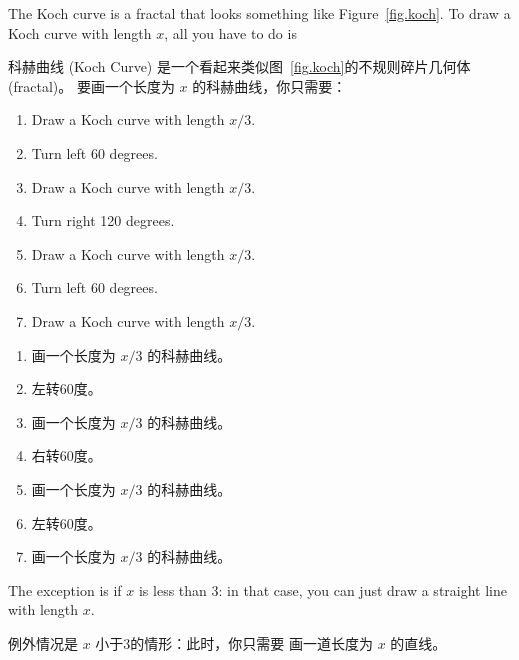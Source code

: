 {{{{\begin{exercise}

The Koch curve is a fractal that looks something like
Figure~\ref{fig.koch}.  To draw a Koch curve with length $x$, all you
have to do is

科赫曲线 (Koch Curve) 是一个看起来类似图~\ref{fig.koch}的不规则碎片几何体 (fractal)。 要画一个长度为 $x$ 的科赫曲线，你只需要：

\begin{enumerate}

\item Draw a Koch curve with length $x/3$.

\item Turn left 60 degrees.

\item Draw a Koch curve with length $x/3$.

\item Turn right 120 degrees.

\item Draw a Koch curve with length $x/3$.

\item Turn left 60 degrees.

\item Draw a Koch curve with length $x/3$.

\end{enumerate}

\begin{enumerate}

\item 画一个长度为 $x/3$ 的科赫曲线。

\item 左转60度。

\item 画一个长度为 $x/3$ 的科赫曲线。

\item 右转60度。

\item 画一个长度为 $x/3$ 的科赫曲线。

\item 左转60度。

\item 画一个长度为 $x/3$ 的科赫曲线。

\end{enumerate}

The exception is if $x$ is less than 3: in that case,
you can just draw a straight line with length $x$.

例外情况是 $x$ 小于3的情形：此时，你只需要
画一道长度为 $x$ 的直线。


\end{exercise}}}}}
